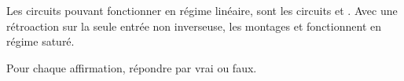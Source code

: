 \reponse{\reponseA{} \reponseD{}}

\begin{corrige}
Les circuits pouvant fonctionner en régime linéaire, sont les circuits \reponseA{} et \reponseD{}. Avec une rétroaction sur la seule entrée non inverseuse, les montages \reponseB{} et \reponseC{} fonctionnent en régime saturé.
\end{corrige}


\finEntrainement






\hauteurLargeurCadreReponse		{5mm}{2cm}
\initialisationEntrainement

\medskip

\initialisationPartieGauche
\begin{center}
  \shorthandoff{!:}
  \shorthandon{!:}
\end{center}
\initialisationPartieDroite

Pour chaque affirmation, répondre par vrai ou faux.

\debutEntrainement

